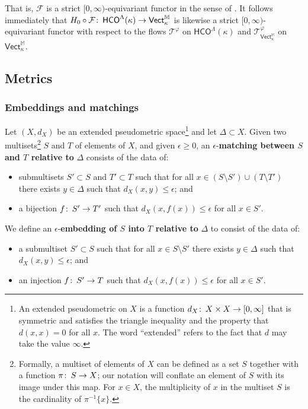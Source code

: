 \documentclass[11pt]{amsart}
\theoremstyle{definition}
\theoremstyle{remark}
\numberwithin{equation}{section}
\def\co{\colon\thinspace}
\def\ep{\epsilon}
\begin{document}
That is, $\mathcal{F}$ is a strict $[0,\infty)$-equivariant functor in the sense of \cite[Section 4]{dSMS}.  It follows immediately that $H_0\circ\mathcal{F}\co \mathsf{HCO}^{\Lambda}(\kappa)\to \mathsf{Vect}_{\kappa}^{\mathbb{M}}$ is likewise a strict $[0,\infty)$-equivariant functor with respect to the flows $\mathcal{T}^{\varphi}$ on $\mathsf{HCO}^{\Lambda}(\kappa)$ and $\mathcal{T}^{\varphi}_{\mathsf{Vect}_{\kappa}^{\mathbb{M}}}$ on $\mathsf{Vect}_{\kappa}^{\mathbb{M}}$.

\subsection{Metrics}

\subsubsection{Embeddings and matchings}

Let $(X,d_X)$ be an extended pseudometric space\footnote{An extended pseudometric on $X$ is a function $d_X\co X\times X\to [0,\infty]$ that is symmetric and satisfies the triangle inequality and the property that $d(x,x)=0$ for all $x$.  The word ``extended'' refers to the fact that $d$ may take the value $\infty$.} and let $\Delta\subset X$.  Given two multisets\footnote{Formally, a multiset of elements of $X$ can be defined as a set $S$ together with a function $\pi\co S\to X$; our notation will conflate an element of $S$ with its image under this map.  For $x\in X$, the multiplicity of $x$ in the multiset $S$ is the cardinality of $\pi^{-1}\{x\}$.} $S$ and $T$ of elements of $X$, and given $\ep\geq 0$, an $\ep$-\textbf{matching between $S$ and $T$ relative to} $\Delta$ consists of the data of: \begin{itemize} 
	\item submultisets $S'\subset S$ and $T'\subset T$ such that for all $x\in (S\setminus S')\cup (T\setminus T')$ there exists $y\in \Delta$ such that $d_X(x,y)\leq \ep$; and
	\item a bijection $f\co S'\to T'$ such that $d_X(x,f(x))\leq\ep$ for all $x\in S'$.
	\end{itemize}

We define an $\ep$-\textbf{embedding of $S$ into $T$ relative to }$\Delta$ to consist of the data of:
\begin{itemize}\item a submultiset $S'\subset S$ such that for all $x\in S\setminus S'$ there exists $y\in \Delta$ such that $d_X(x,y)\leq \ep$; and 
\item an injection $f\co S'\to T$ such that $d_X(x,f(x))\leq\ep$ for all $x\in S'$.
\end{itemize}
\end{document}
